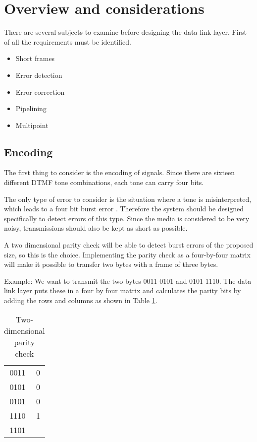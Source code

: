 \section{Overview and considerations}\label{sec:dll_theory}

There are several subjects to examine before designing the data link layer.
First of all the requirements must be identified. 
\begin{itemize}
	\item Short frames
	\item Error detection
	\item Error correction
	\item Pipelining
	\item Multipoint
\end{itemize}

\subsection{Encoding}
The first thing to consider is the encoding of signals. Since there are sixteen
different DTMF tone combinations, each tone can carry four bits.

The only type of error to consider is the situation where a tone is
misinterpreted, which leads to a four bit burst error \cite[267]{KOM}.
Therefore the system should be designed specifically to detect errors of this type. Since the media
is considered to be very noisy, transmissions should also be kept as short as
possible.

A two dimensional parity check will be able to detect burst errors of the
proposed size, so this is the choice. Implementing the parity check as a
four-by-four matrix will make it possible to transfer two bytes with a frame of
three bytes.

Example: We want to transmit the two bytes 0011 0101 and 0101 1110. The data
link layer puts these in a four by four matrix and calculates the parity bits by
adding the rows and columns as shown in Table \ref{tab:two_dimensional_parity_check}.

\begin{table}[htb]
	\centering
	\begin{tabular}{c|c}
	0011 & 0 \\
	0101 & 0 \\
	0101 & 0 \\
	1110 & 1 \\
	\hline
	1101 & \\
	\end{tabular}
	\caption{Two-dimensional parity check}
	\label{tab:two_dimensional_parity_check}
\end{table}

